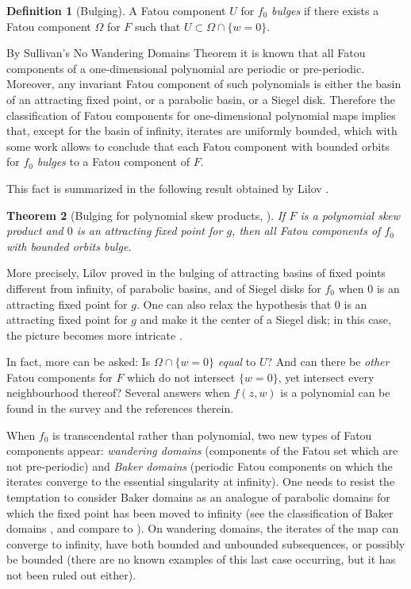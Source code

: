 \documentclass[a4paper, 12pt, twoside]{amsart}
\newtheorem{thm}{Theorem}[section]
\theoremstyle{definition}
\newtheorem{defn}[thm]{Definition}
\numberwithin{equation}{section}
\begin{document}
   \begin{defn}[Bulging]\label{def:bulging}
  A Fatou component $U$ for $f_{0}$ \emph{bulges} if there exists a Fatou component $\Omega$ for $F$ such that $U\subset\Omega\cap\{w=0\}$.
  \end{defn} 
  
  By Sullivan's No Wandering Domains Theorem \cite{Sullivan1985} it is known that all Fatou components of a one-dimensional polynomial are periodic or pre-periodic. Moreover, any invariant Fatou component of such polynomials is either the basin of an attracting fixed point, or a parabolic basin, or a Siegel disk. 
  Therefore the classification of Fatou components for one-dimensional polynomial maps  implies that, except for the basin of infinity, iterates are uniformly bounded, which with some work allows to conclude that each Fatou component with bounded orbits for $f_{0}$ \emph{bulges} to a Fatou component of $F$. 
  
   This fact is summarized in the following result obtained by Lilov \cite{Lilov}.
  
  
  
  \begin{thm}[Bulging for polynomial skew products, \cite{Lilov}]
  If $F$ is a polynomial skew product and $0$ is an attracting fixed point for $g$, then all Fatou components of $f_{0}$ with bounded orbits bulge. 
  \end{thm}
   
   More precisely, Lilov proved in \cite[Sect. 3.2.1]{Lilov} the bulging of attracting basins of fixed points different from infinity,  of parabolic basins, and of Siegel disks for $f_{0}$ when $0$ is an attracting fixed point for $g$.
   One can also relax the hypothesis that $0$ is an attracting fixed point for $g$ and make it the center of a Siegel disk; in this case, the picture becomes more intricate \cite{PetersRaissy}. 
  
   In fact, more can be asked: Is $\Omega \cap \{w=0\}$ \emph{equal} to $U$? And can there be \emph{other} Fatou components for $F$ which do not intersect $\{w=0\}$, yet intersect every  neighbourhood thereof? Several answers when $f(z,w)$ is a polynomial can be found in the survey \cite{Raissy2017} and the references therein. 

 When $f_0$ is transcendental rather than polynomial, two new types of Fatou components appear: \emph{wandering domains} (components of the Fatou set which are not pre-periodic) and \emph{Baker domains} (periodic Fatou components on which the iterates converge to the essential singularity at infinity). One needs to resist the temptation to consider Baker domains as  an analogue of parabolic domains for which the fixed point has been moved to infinity (see the  classification of Baker domains  \cite{FagellaHenriksen}, and compare to  \cite{Cowen}). On wandering domains, the iterates of the map can converge to infinity, have both bounded and unbounded subsequences, or possibly be bounded (there are no known examples of this last case occurring, but it has not been ruled out either).
  
\end{document}
